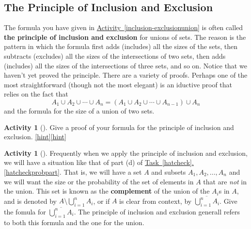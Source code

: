 \documentclass[10pt,]{book}
\newcommand{\terminology}[1]{\textbf{#1}}
\theoremstyle{plain}
\theoremstyle{definition}
\theoremstyle{definition}
\theoremstyle{definition}
\newtheorem{activity}[project]{Activity}
\numberwithin{equation}{chapter}
\begin{document}
\subsection[{The Principle of Inclusion and Exclusion}]{The Principle of Inclusion and Exclusion}\label{subsection-28}
\hypertarget{p-1197}{}%
The formula you have given in \hyperref[inclusion-exclusionunion]{Activity~\ref{inclusion-exclusionunion}} is often called \terminology{the principle of inclusion and exclusion} for unions of sets. The reason is the pattern in which the formula first adds (includes) all the sizes of the sets, then subtracts (excludes) all the sizes of the intersections of two sets, then adds (includes) all the sizes of the intersections of three sets, and so on.   Notice that we haven't yet proved the principle. There are a variety of proofs.  Perhaps one of the most straightforward (though not the most elegant) is an iductive proof that relies on the fact that%
\begin{equation*}
A_1 \cup A_2 \cup \cdots \cup A_n = \left(A_1 \cup A_2 \cup \cdots \cup A_{n-1}\right) \cup A_n
\end{equation*}
and the formula for the size of a union of two sets.%
\begin{activity}[]\label{activity-216}
\hypertarget{p-1198}{}%
Give a proof of your formula for the principle of inclusion and exclusion.%
\hfill{\tiny\hyperlink{a-223}{[hint]}\hypertarget{q-223}{}}\hfill{\tiny\hyperlink{a-223}{[hint]}\hypertarget{q-223}{}}\end{activity}
\begin{activity}[]\label{compunion}
\hypertarget{p-1202}{}%
Frequently when we apply the principle of inclusion and exclusion, we will have a situation like that of part (d) of \hyperref[hatcheckprobpart]{Task~\ref{hatcheck}.\ref{hatcheckprobpart}}.  That is, we will have a set \(A\) and subsets \(A_1, A_2, \ldots, A_n\) and we will want the size or the probability of the set of elements in \(A\) that are \emph{not} in the union.  This set is known as the \terminology{complement}  of the union of the \(A_i\)s in \(A\), and is denoted by \(A \setminus \bigcup_{i=1}^n A_i\), or if \(A\) is clear from context, by \(\overline{\bigcup_{i=1}^n A_i}\). Give the fomula for \(\overline{\bigcup_{i=1}^n A_i}\).  The principle of inclusion and exclusion generall refers to both this formula and the one for the union.%
\end{activity}
\end{document}
